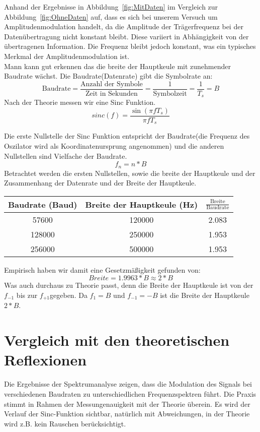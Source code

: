 Anhand der Ergebnisse in Abbildung~\ref{fig:MitDaten} im Vergleich zur Abbildung~\ref{fig:OhneDaten} auf, dass es sich bei unserem Versuch um Amplitudenmodulation handelt, da die Amplitude der Trägerfrequenz bei der Datenübertragung nicht konstant bleibt. Diese variiert in Abhängigkeit von der übertragenen Information. Die Frequenz bleibt jedoch konstant, was ein typisches Merkmal der Amplitudenmodulation ist.
\\
Mann kann gut erkennen das die breite der Hauptkeule mit zunehmender Baudrate wächst.
Die Baudrate(Datenrate) gibt die Symbolrate an:
\begin{equation}
    \text{Baudrate} = \frac{\text{Anzahl der Symbole}}{\text{Zeit in Sekunden}}= \frac{1}{\text{Symbolzeit}}= \frac{1}{T_s} = B
\end{equation}
Nach der Theorie messen wir eine Sinc Funktion.
\begin{equation}
    sinc(f) = \frac{\sin(\pi f T_s)}{\pi f T_s}
\end{equation}

Die erste Nullstelle der Sinc Funktion entspricht der Baudrate(die Frequenz des Oszilator wird als Koordinatenursprung angenommen)
und die anderen Nullstellen sind Vielfache der Baudrate.
\begin{equation}
    f_n = n * B
\end{equation}
Betrachtet werden die ersten Nullstellen, sowie die breite der Hauptkeule und der Zusammenhang der Datenrate und der Breite der Hauptkeule.

\begin{center}
\begin{tabular}{|c|c|c|}
    \hline
    Baudrate (Baud) & Breite der Hauptkeule (Hz)& $\frac{\text{Breite}}{\text{Baudrate}}$  \\
    \hline
    57600 & 120000 & 2.083 \\
    128000 & 250000 & 1.953 \\
    256000 & 500000 & 1.953 \\
    \hline
\end{tabular}
\end{center}

Empirisch haben wir damit eine Gesetzmäßigkeit gefunden von:
\begin{equation}
    Breite = 1.9963 * B \approx 2 * B
\end{equation}
Was auch durchaus zu Theorie passt, denn die Breite der Hauptkeule ist von der $f_{-1}$ bis zur $f_{+1}$gegeben.
Da $f_{1} = B$ und $f_{-1} = -B$ ist die Breite der Hauptkeule $2 * B$.

\section{Vergleich mit den theoretischen Reflexionen}
Die Ergebnisse der Spektrumanalyse zeigen, dass die Modulation des Signals bei verschiedenen Baudraten zu unterschiedlichen Frequenzspektren führt. Die Praxis stimmt in Rahmen der Messungenauigkeit mit der Theorie überein.
Es wird der Verlauf der Sinc-Funktion sichtbar, natürlich mit Abweichungen, in der Theorie wird z.B. kein Rauschen berücksichtigt.
\clearpage